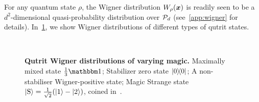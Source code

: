 \documentclass[pra,
aps,
twocolumn,
superscriptaddress,
groupedaddress,
nofootinbib,
reprint
]{revtex4-1}
\begin{document}
For any quantum state $\rho$, the Wigner distribution $W_\rho(\bmx)$ is readily seen to be a $d^2$-dimensional quasi-probability distribution over $\cal{P}_d$ (see~\cref{app:wigner} for details).  In~\cref{fig:wstate_examples}, we show Wigner distributions of different types of qutrit states.
\begin{figure}%
    \centering
    \hspace{8pt}%
    \\
    \hspace{8pt}%
    \caption{\textbf{Qutrit Wigner distributions of varying magic.} 
     Maximally mixed state $\frac{1}{3}\id$;  Stabilizer zero state $\ketbra{0}{0}$;  A non-stabiliser Wigner-positive state;  Magic Strange state $\ket{{\rm{S}}} = \frac{1}{\sqrt{2}}(\ket{1} - \ket{2})$, coined in~\cite{cit:veitch2}.
    }%
    \label{fig:wstate_examples}
\end{figure}
\end{document}
